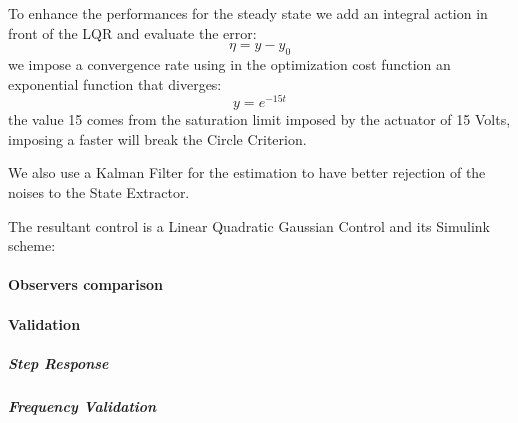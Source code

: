                     To enhance the performances for the steady state we add an integral action in front of the LQR and evaluate the error:
                    \[
                        \eta = y-y_0\]
                    we impose a convergence rate using in the optimization cost function an exponential function that diverges:
                     \[
                        y =  e^{-15t} \]
                    the value 15 comes from the saturation limit imposed by the actuator of 15 Volts, imposing a faster will break the Circle Criterion.

                    We also use a Kalman Filter for the estimation to have better rejection of the noises \wrt to the State Extractor. 
                    
                    The resultant control is a Linear Quadratic Gaussian Control and its Simulink scheme:





                \paragraph{Observers comparison}

                \paragraph{Validation}

                    \subparagraph{Step Response}
                    \subparagraph{Frequency Validation}